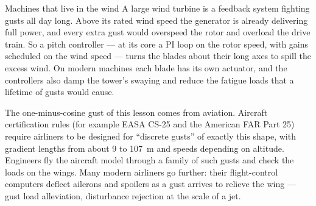 \begin{curiosity}{Machines that live in the wind}
A large wind turbine is a feedback system fighting gusts all day long. Above its rated wind speed the generator is already delivering full power, and every extra gust would overspeed the rotor and overload the drive train. So a pitch controller — at its core a PI loop on the rotor speed, with gains scheduled on the wind speed — turns the blades about their long axes to spill the excess wind. On modern machines each blade has its own actuator, and the controllers also damp the tower's swaying and reduce the fatigue loads that a lifetime of gusts would cause.

The one-minus-cosine gust of this lesson comes from aviation. Aircraft certification rules (for example EASA CS-25 and the American FAR Part 25) require airliners to be designed for \enquote{discrete gusts} of exactly this shape, with gradient lengths from about 9 to \SI{107}{m} and speeds depending on altitude. Engineers fly the aircraft model through a family of such gusts and check the loads on the wings. Many modern airliners go further: their flight-control computers deflect ailerons and spoilers as a gust arrives to relieve the wing — gust load alleviation, disturbance rejection at the scale of a jet.
\end{curiosity}

